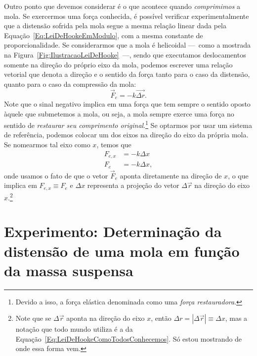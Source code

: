 Outro ponto que devemos considerar é o que acontece quando \emph{comprimimos} a mola. Se exercermos uma força conhecida, é possível verificar experimentalmente que a distensão sofrida pela mola segue a mesma relação linear dada pela Equação~\eqref{Eq:LeiDeHookeEmModulo}, com a mesma constante de proporcionalidade. Se considerarmos que a mola é helicoidal ---~como a mostrada na Figura~\ref{Fig:IlustracaoLeiDeHooke}~---, sendo que executamos deslocamentos somente na direção do próprio eixo da mola, podemos escrever uma relação vetorial que denota a direção e o sentido da força tanto para o caso da distensão, quanto para o caso da compressão da mola:
\begin{equation}
    \vec{F}_e = - k \vec{\Delta r}.
\end{equation}
%
Note que o sinal negativo implica em uma força que tem sempre o sentido oposto àquele que submetemos a mola, ou seja, a mola sempre exerce uma força no sentido de \emph{restaurar seu comprimento original}.\footnote{ Devido a isso, a força elástica denominada como uma \emph{força restauradora}.} Se optarmos por usar um sistema de referência, podemos colocar um dos eixos na direção do eixo da própria mola. Se nomearmos tal eixo como $x$, temos que
\begin{align}
    F_{e,x} &= -k \Delta x \\
    F_e &= -k \Delta x, \label{Eq:LeiDeHookeComoTodosConhecemos}
\end{align}
%
onde usamos o fato de que o vetor $\vec{F}_{e}$ aponta diretamente na direção de $x$, o que implica em $F_{e,x} \equiv F_e$ e $\Delta x$ representa a projeção do vetor $\Delta \vec{r}$ na direção do eixo $x$.\footnote{Note que se $\Delta \vec{r}$ aponta na direção do eixo $x$, então $\Delta r = |\Delta \vec{r}| \equiv \Delta x$, mas a notação que todo mundo utiliza é a da Equação~\eqref{Eq:LeiDeHookeComoTodosConhecemos}. Só estou mostrando de onde essa forma vem.}


\section{Experimento: Determinação da distensão de uma mola em função da massa suspensa}

